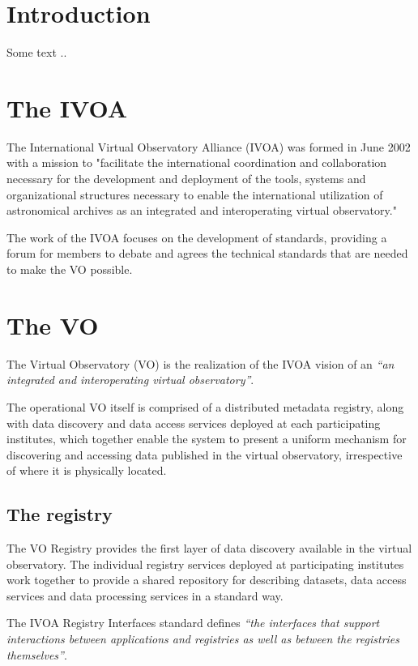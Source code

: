 \documentclass{article}
\begin{document}
\section{Introduction}

Some text ..

\section{The IVOA}

The International Virtual Observatory Alliance (IVOA) was formed in June 2002
with a mission to "facilitate the international coordination and collaboration
necessary for the development and deployment of the tools, systems and
organizational structures necessary to enable the international utilization of
astronomical archives as an integrated and interoperating virtual observatory."

The work of the IVOA focuses on the development of standards, providing a forum
for members to debate and agrees the technical standards that are needed to make
the VO possible.

\section{The VO}

The Virtual Observatory (VO) is the realization of the IVOA vision of an
\textit{``an integrated and interoperating virtual observatory''}.

The operational VO itself is comprised of a distributed metadata registry, along
with data discovery and data access services deployed at each participating
institutes, which together enable the system to present a uniform mechanism for
discovering and accessing data published in the virtual observatory,
irrespective of where it is physically located.

\subsection{The registry}

The VO Registry provides the first layer of data discovery available in the
virtual observatory. The individual registry services deployed at participating
institutes work together to provide a shared repository for describing datasets,
data access services and data processing services in a standard way.

The IVOA Registry Interfaces standard
defines 
\textit{``the interfaces that support interactions between applications and
registries as well as between the registries themselves''}.
\end{document}
